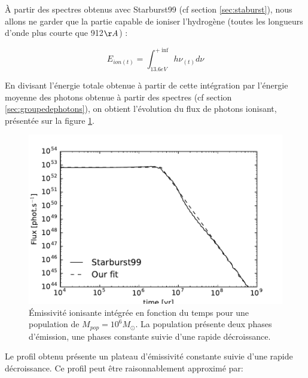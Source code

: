 


À partir des spectres obtenus avec Starburst99 (cf section \ref{sec:staburst}), nous allons ne garder que la partie capable de ioniser l'hydrogène (toutes les longueurs d'onde plus courte que 912$\AA$) :

\begin{equation}
E_{ion (t)} = \int_{13.6eV}^{+\inf} h \nu_{(t)} d\nu
\end{equation}

En divisant l'énergie totale obtenue à partir de cette intégration par l'énergie moyenne des photons obtenue à partir des spectres (cf section \ref{sec:groupedephotons}), on obtient l'évolution du flux de photons ionisant, présentée sur la figure \ref{fig:flux}.
\begin{figure}
        \includegraphics[width=.95\linewidth]{img/03/flux.pdf} 
        \caption[Émissivité ionisante]{Émissivité ionisante intégrée en fonction du temps pour une population de $M_{pop}=10^6 M_\odot$.
        La population présente deux phases d'émission, une phases constante suivie d'une rapide décroissance.
 		\label{fig:flux}}
\end{figure}
Le profil obtenu présente un plateau d'émissivité constante suivie d'une rapide décroissance.
Ce profil peut être raisonnablement approximé par:

